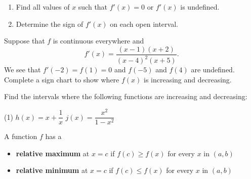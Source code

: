 \documentclass[../mathNotesPreamble]{subfiles}
\begin{document}
  \begin{thmBox*}
    \begin{enumerate}
      \item Find all values of $x$ such that $f'(x)=0$ or $f'(x)$ is undefined.
      \item Determine the sign of $f'(x)$ on each open interval.
    \end{enumerate}
  \end{thmBox*}
  \begin{ex*}
    Suppose that $f$ is continuous everywhere and
      \[f'(x)=\dfrac{(x-1)(x+2)}{(x-4)^2(x+5)}.\]
    We see that $f'(-2)=f(1)=0$ and $f(-5)$ and $f(4)$ are undefined. Complete a sign chart to show where $f(x)$ is increasing and decreasing.
  \end{ex*}
  \pagebreak
  
  \begin{ex*}
    Find the intervals where the following functions are increasing and decreasing:
  \end{ex*}
  \pagebreak

  \begin{extasks}[after-item-skip=\stretch{1}](1)
    \task $h(x)=x+\dfrac{1}{x}$
    \task $j(x)=\dfrac{x^2}{1-x^2}$
  \end{extasks}
  \pagebreak

  \begin{defn*}
    A function $f$ has a
    \begin{itemize}
      \item
        \textbf{relative maximum} at $x=c$ if $f(c)\geq f(x)$ for every $x$ in $(a,b)$
      \item
        \textbf{relative minimum} at $x=c$ if $f(c)\leq f(x)$ for every $x$ in $(a,b)$
    \end{itemize}
  \end{defn*}
\end{document}
